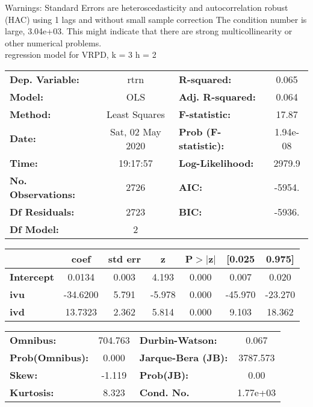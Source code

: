 Warnings: \newline
 [1] Standard Errors are heteroscedasticity and autocorrelation robust (HAC) using 1 lags and without small sample correction \newline
 [2] The condition number is large, 3.04e+03. This might indicate that there are \newline
 strong multicollinearity or other numerical problems.\\ 

regression model for VRPD, k = 3 h = 2\begin{center}
\begin{tabular}{lclc}
\toprule
\textbf{Dep. Variable:}    &       rtrn       & \textbf{  R-squared:         } &     0.065   \\
\textbf{Model:}            &       OLS        & \textbf{  Adj. R-squared:    } &     0.064   \\
\textbf{Method:}           &  Least Squares   & \textbf{  F-statistic:       } &     17.87   \\
\textbf{Date:}             & Sat, 02 May 2020 & \textbf{  Prob (F-statistic):} &  1.94e-08   \\
\textbf{Time:}             &     19:17:57     & \textbf{  Log-Likelihood:    } &    2979.9   \\
\textbf{No. Observations:} &        2726      & \textbf{  AIC:               } &    -5954.   \\
\textbf{Df Residuals:}     &        2723      & \textbf{  BIC:               } &    -5936.   \\
\textbf{Df Model:}         &           2      & \textbf{                     } &             \\
\bottomrule
\end{tabular}
\begin{tabular}{lcccccc}
                   & \textbf{coef} & \textbf{std err} & \textbf{z} & \textbf{P$> |$z$|$} & \textbf{[0.025} & \textbf{0.975]}  \\
\midrule
\textbf{Intercept} &       0.0134  &        0.003     &     4.193  &         0.000        &        0.007    &        0.020     \\
\textbf{ivu}       &     -34.6200  &        5.791     &    -5.978  &         0.000        &      -45.970    &      -23.270     \\
\textbf{ivd}       &      13.7323  &        2.362     &     5.814  &         0.000        &        9.103    &       18.362     \\
\bottomrule
\end{tabular}
\begin{tabular}{lclc}
\textbf{Omnibus:}       & 704.763 & \textbf{  Durbin-Watson:     } &    0.067  \\
\textbf{Prob(Omnibus):} &   0.000 & \textbf{  Jarque-Bera (JB):  } & 3787.573  \\
\textbf{Skew:}          &  -1.119 & \textbf{  Prob(JB):          } &     0.00  \\
\textbf{Kurtosis:}      &   8.323 & \textbf{  Cond. No.          } & 1.77e+03  \\
\bottomrule
\end{tabular}
\end{center}

